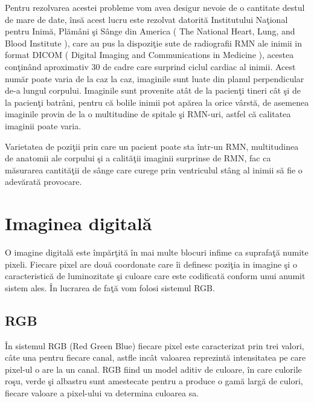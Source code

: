 Pentru rezolvarea acestei probleme vom avea desigur nevoie de o cantitate destul de mare de date, \^{i}ns\u{a} acest lucru este rezolvat datorit\u{a} Institutului Na\c{t}ional pentru Inim\u{a}, Pl\u{a}m\^{a}ni \c{s}i S\^{a}nge din America ( The National Heart, Lung, and Blood Institute ), care au pus la dispozi\c{t}ie sute de radiografii RMN ale inimii in format DICOM ( Digital Imaging and Communications in Medicine ), acestea con\c{t}in\^{a}nd aproximativ 30 de cadre care surprind ciclul cardiac al inimii. Acest num\u{a}r poate varia de la caz la caz, imaginile sunt luate din planul perpendicular de-a lungul corpului. Imaginile sunt provenite at\^{a}t de la pacien\c{t}i tineri c\^{a}t \c{s}i de la pacien\c{t}i batr\^{a}ni, pentru c\u{a} bolile inimii pot ap\u{a}rea la orice v\^{a}rst\u{a}, de asemenea imaginile provin de la o multitudine de spitale \c{s}i RMN-uri, astfel c\u{a} calitatea imaginii poate varia.

\par

Varietatea de pozi\c{t}ii prin care un pacient poate sta \^{i}ntr-un RMN, multitudinea de anatomii ale corpului \c{s}i a calit\u{a}\c{t}ii imaginii surprinse de RMN, fac ca m\u{a}surarea cantit\u{a}\c{t}ii de s\^{a}nge care curege prin ventriculul st\^{a}ng al inimii s\u{a} fie o adev\u{a}rat\u{a} provocare.

\section{Imaginea digital\u{a}}

O imagine digital\u{a} este \^{i}mp\u{a}r\c{t}it\u{a} \^{i}n mai multe blocuri infime ca suprafa\c{t}\u{a} numite pixeli. Fiecare pixel are dou\u{a} coordonate care \^{i}i definesc pozi\c{t}ia in imagine \c{s}i o caracteristic\u{a} de luminozitate \c{s}i culoare care este codificat\u{a} conform unui anumit sistem ales. \^{I}n lucrarea de fa\c{t}\u{a} vom folosi sistemul RGB.

\subsection{RGB}

\^{I}n sistemul RGB (Red Green Blue) fiecare pixel este caracterizat prin trei valori, c\^{a}te una pentru fiecare canal, astfle inc\^{a}t valoarea reprezint\u{a} intensitatea pe care pixel-ul o are la un canal. RGB fiind un model aditiv de culoare, \^{i}n care culorile ro\c{s}u, verde \c{s}i albastru sunt amestecate pentru a produce o gam\u{a} larg\u{a} de culori, fiecare valoare a pixel-ului va determina culoarea sa.

